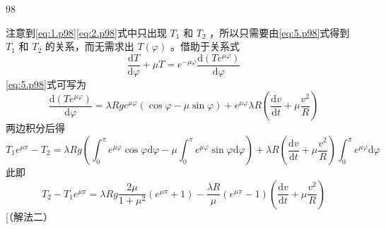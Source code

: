 \begin{solution}{98}
\begin{subsolution}
        注意到\eqref{eq:1.p98}\eqref{eq:2.p98}式中只出现 $T_{1}$ 和 $T_{2}$ ，所以只需要由\eqref{eq:5.p98}式得到 $T_{1}$ 和 $T_{2}$ 的关系，而无需求出 $T(\varphi)$ 。借助于关系式
        \begin{equation}
            \frac {\mathrm{d} T}{\mathrm{d} \varphi} + \mu T = e ^ {- \mu \varphi} \frac {\mathrm{d} (T e ^ {\mu \varphi})}{\mathrm{d} \varphi}
            \label{eq:6.p98}
        \end{equation}
        \eqref{eq:5.p98}式可写为
        \begin{equation}
            \frac {\mathrm{d} \left(T e ^ {\mu \varphi}\right)}{\mathrm{d} \varphi} = \lambda R g e ^ {\mu \varphi} (\cos \varphi - \mu \sin \varphi) + e ^ {\mu \varphi} \lambda R \left(\frac {\mathrm{d} v}{\mathrm{d} t} + \mu \frac {v ^ {2}}{R}\right)
            \label{eq:7.p98}
        \end{equation}
        两边积分后得
        \begin{equation}
            T _ {1} e ^ {\mu \pi} - T _ {2} = \lambda R g \left(\int_ {0} ^ {\pi} e ^ {\mu \varphi} \cos \varphi \mathrm{d} \varphi - \mu \int_ {0} ^ {\pi} e ^ {\mu \varphi} \sin \varphi \mathrm{d} \varphi\right) + \lambda R \left(\frac {\mathrm{d} v}{\mathrm{d} t} + \mu \frac {v ^ {2}}{R}\right) \int_ {0} ^ {\pi} e ^ {\mu \varphi} \mathrm{d} \varphi
            \label{eq:8.p98}
        \end{equation}
        此即
        \begin{equation}
            T _ {2} - T _ {1} e ^ {\mu \pi} = \lambda R g \frac {2 \mu}{1 + \mu^ {2}} (e ^ {\mu \pi} + 1) - \frac {\lambda R}{\mu} (e ^ {\mu \pi} - 1) \left(\frac {\mathrm{d} v}{\mathrm{d} t} + \mu \frac {v ^ {2}}{R}\right)
            \label{eq:9.p98}
        \end{equation}
        [（解法二）


\end{subsolution}
\end{solution}
